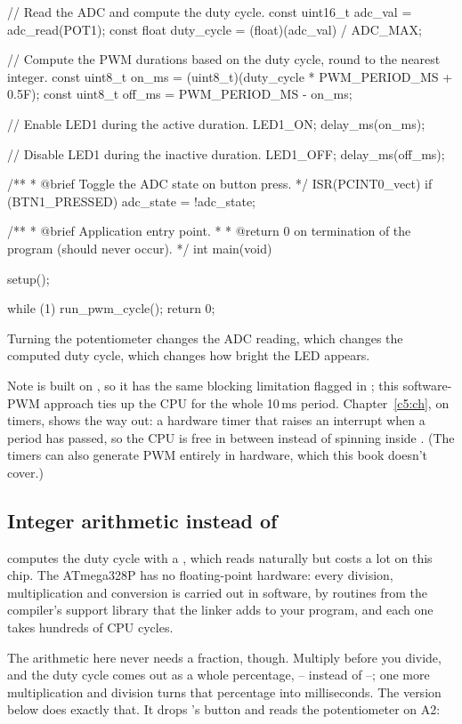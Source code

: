 \begin{ccode}
{    // Read the ADC and compute the duty cycle.
    const uint16_t adc_val = adc_read(POT1);
    const float duty_cycle = (float)(adc_val) / ADC_MAX;

    // Compute the PWM durations based on the duty cycle, round to the nearest integer.
    const uint8_t on_ms  = (uint8_t)(duty_cycle * PWM_PERIOD_MS + 0.5F);
    const uint8_t off_ms = PWM_PERIOD_MS - on_ms;

    // Enable LED1 during the active duration.
    LED1_ON;
    delay_ms(on_ms);

    // Disable LED1 during the inactive duration.
    LED1_OFF;
    delay_ms(off_ms);
}

/**
 * @brief Toggle the ADC state on button press.
 */
ISR(PCINT0_vect)
{
    if (BTN1_PRESSED) { adc_state = !adc_state; }
}

/**
 * @brief Application entry point.
 *
 * @return 0 on termination of the program (should never occur).
 */
int main(void)
{
    setup();

    while (1)
    {
        run_pwm_cycle();
    }
    return 0;
}
\end{ccode}

\noindent Turning the potentiometer changes the ADC reading, which changes the computed duty cycle,
which changes how bright the LED appears.

Note  is built on , so it has the same blocking limitation
flagged in ; this software-PWM approach ties up the CPU for the whole 10\,ms
period. Chapter~\ref{c5:ch}, on timers, shows the way out: a hardware timer that raises an
interrupt when a period has passed, so the CPU is free in between instead of spinning inside
. (The timers can also generate PWM entirely in hardware, which this book doesn't
cover.)

\subsection{Integer arithmetic instead of }
\label{c4:a:5}
 computes the duty cycle with a , which reads naturally but costs a lot
on this chip. The ATmega328P has no floating-point hardware: every  division,
multiplication and conversion is carried out in software, by routines from the compiler's support
library that the linker adds to your program, and each one takes hundreds of CPU cycles.

The arithmetic here never needs a fraction, though. Multiply before you divide, and the duty cycle
comes out as a whole percentage, -- instead of --; one more
multiplication and division turns that percentage into milliseconds. The version below does
exactly that. It drops 's button and reads the potentiometer on A2:

